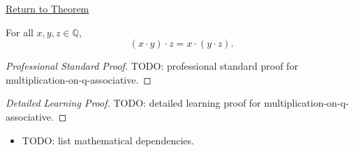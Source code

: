 \newpage
{}
\label{prf:multiplication-on-q-associative}

\begin{remark*}[Return]
\hyperref[thm:multiplication-on-q-associative]{Return to Theorem}
\end{remark*}

\begin{theorem*}
For all $x,y,z\in\mathbb{Q}$,
\[
(x\cdot y)\cdot z=x\cdot(y\cdot z).
\]
\end{theorem*}

\begin{proof}[Professional Standard Proof]
\LRAProofBodyStart
TODO: professional standard proof for multiplication-on-q-associative.
\end{proof}

\begin{proof}[Detailed Learning Proof]
\LRAProofBodyStart
TODO: detailed learning proof for multiplication-on-q-associative.
\end{proof}

\begin{remark*}
\end{remark*}

\begin{dependencies}
\begin{itemize}
  \item TODO: list mathematical dependencies.
\end{itemize}
\end{dependencies}

\clearpage
